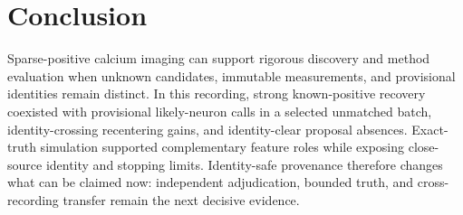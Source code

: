 \section{Conclusion}

Sparse-positive calcium imaging can support rigorous discovery and method
evaluation when unknown candidates, immutable measurements, and provisional
identities remain distinct. In this recording, strong known-positive recovery
coexisted with provisional likely-neuron calls in a selected unmatched batch,
identity-crossing recentering gains, and identity-clear proposal absences.
Exact-truth simulation supported complementary feature roles while exposing
close-source identity and stopping limits. Identity-safe provenance therefore
changes what can be claimed now: independent adjudication, bounded truth, and
cross-recording transfer remain the next decisive evidence.
